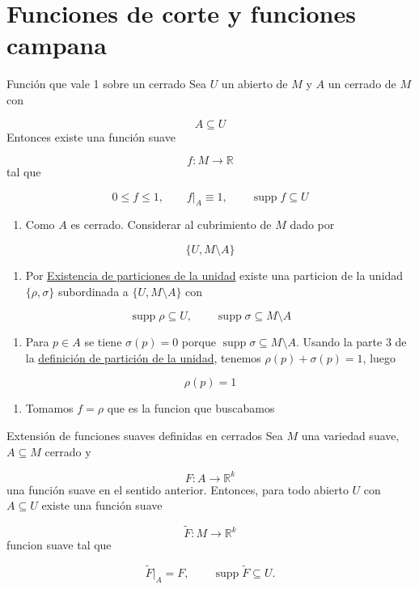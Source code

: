 \section{Funciones de corte y funciones campana}
\begin{bookcorollary}{Función que vale 1 sobre un cerrado}
Sea $U$ un abierto de $M$ y $A$ un cerrado de $M$ con

\[
A\subseteq U
\]
Entonces existe una función suave

\[
f:M\to\mathbb R
\]
tal que

\[
0\le f\le 1,\qquad f|_A\equiv 1,\qquad \operatorname{supp}f\subseteq U
\]
\end{bookcorollary}
\begin{bookproof}{}
\begin{enumerate}
\item Como $A$ es cerrado. Considerar al cubrimiento de $M$ dado por
\end{enumerate}
\[
\{U,M\setminus A\}
\]
\begin{enumerate}[start=2]
\item Por \hyperref[blk:eafe2b]{Existencia de particiones de la unidad} existe una particion de la unidad $\{\rho,\sigma\}$ subordinada a $\{U,M\setminus A\}$ con
\end{enumerate}
\[
\operatorname{supp}\rho\subseteq U,\qquad \operatorname{supp}\sigma\subseteq M\setminus A
\]
\begin{enumerate}[start=3]
\item Para $p\in A$ se tiene $\sigma(p)=0$ porque $\operatorname{supp}\sigma\subseteq M\setminus A$. Usando la parte 3 de la \hyperref[blk:f5db1b]{definición de partición de la unidad}, tenemos $\rho(p)+\sigma(p)=1$, luego
\end{enumerate}
\[
\rho(p)=1
\]
\begin{enumerate}[start=4]
\item Tomamos $f=\rho$ que es la funcion que buscabamos
\end{enumerate}
\bookqed
\end{bookproof}
\begin{bookproposition}{Extensión de funciones suaves definidas en cerrados}
Sea $M$ una variedad suave, $A\subseteq M$ cerrado y

\[
F:A\to\mathbb R^k
\]
una función suave en el sentido anterior. Entonces, para todo abierto $U$ con $A\subseteq U$ existe una función suave

\[
\widetilde F:M\to\mathbb R^k
\]
funcion suave tal que

\[
\widetilde F|_A=F,
\qquad
\operatorname{supp}\widetilde F\subseteq U.
\]
\end{bookproposition}
